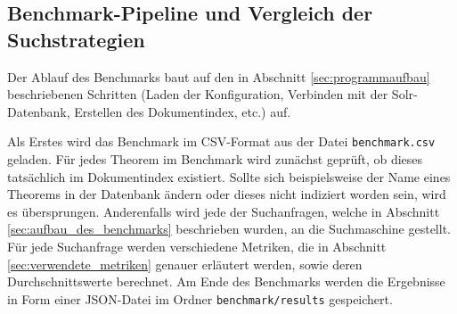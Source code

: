 \documentclass[12pt,letterpaper]{article} %
\begin{document}
\subsection{Benchmark-Pipeline und Vergleich der Suchstrategien}

Der Ablauf des Benchmarks baut auf den in Abschnitt \ref{sec:programmaufbau} beschriebenen Schritten (Laden der Konfiguration, Verbinden mit der Solr-Datenbank, Erstellen des Dokumentindex, etc.) auf.

Als Erstes wird das Benchmark im CSV-Format aus der Datei \texttt{benchmark.csv} geladen.
Für jedes Theorem im Benchmark wird zunächst geprüft, ob dieses tatsächlich im Dokumentindex existiert.
Sollte sich beispielsweise der Name eines Theorems in der Datenbank ändern oder dieses nicht indiziert worden sein, wird es übersprungen.
Anderenfalls wird jede der Suchanfragen, welche in Abschnitt \ref{sec:aufbau_des_benchmarks} beschrieben wurden, an die Suchmaschine gestellt.
Für jede Suchanfrage werden verschiedene Metriken, die in Abschnitt \ref{sec:verwendete_metriken} genauer erläutert werden, sowie deren Durchschnittswerte berechnet.
Am Ende des Benchmarks werden die Ergebnisse in Form einer JSON-Datei im Ordner \texttt{benchmark/results} gespeichert.
\end{document}
